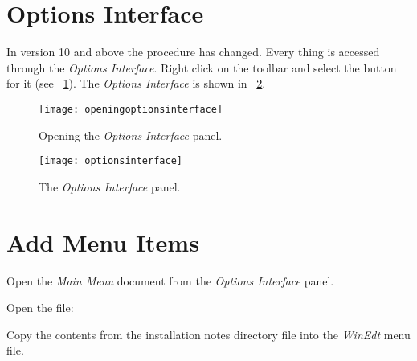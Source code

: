 \documentclass{lebook}
\begin{document}
\section{Options Interface}
In version 10 and above the procedure has changed.  Every thing is accessed through the \textit{Options Interface}.  Right click on the toolbar and select the button for it (see \figurename~\ref{fig:openingoptionsinterface}).  The \textit{Options Interface} is shown in \figurename~\ref{fig:optionsinterface}.
\begin{figure}
	\centering
	\texttt{[image: openingoptionsinterface]}
	\caption{Opening the \textit{Options Interface} panel.}
	\label{fig:openingoptionsinterface}
\end{figure}

\begin{figure}
	\centering
	\texttt{[image: optionsinterface]}
	\caption{The \textit{Options Interface} panel.}
	\label{fig:optionsinterface}
\end{figure}


\section{Add Menu Items}

\begin{numberedlist}
	\item Open the \textit{Main Menu} document from the \textit{Options Interface} panel.
       \item Open the file: 
       \item Copy the contents from the installation notes directory file into the \textit{WinEdt} menu file.
\end{numberedlist}
\end{document}
